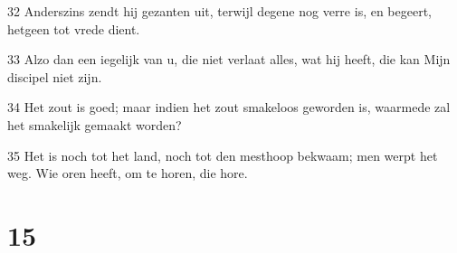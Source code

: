 \par 32 Anderszins zendt hij gezanten uit, terwijl degene nog verre is, en begeert, hetgeen tot vrede dient.
\par 33 Alzo dan een iegelijk van u, die niet verlaat alles, wat hij heeft, die kan Mijn discipel niet zijn.
\par 34 Het zout is goed; maar indien het zout smakeloos geworden is, waarmede zal het smakelijk gemaakt worden?
\par 35 Het is noch tot het land, noch tot den mesthoop bekwaam; men werpt het weg. Wie oren heeft, om te horen, die hore.

\chapter{15}

